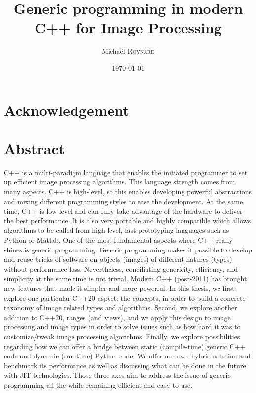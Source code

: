 \documentclass[11pt,a4paper]{book}
\author{Michaël \textsc{Roynard}}
\title{Generic programming in modern C++ for Image Processing}
\date{\today}
\begin{document}
\flyleaf
\cleardoublepage

\section*{Acknowledgement}
\label{sec:acknowledgement}


\section*{Abstract}
\label{sec:abstract}
C++ is a multi-paradigm language that enables the initiated programmer to set up efficient image processing algorithms.
This language strength comes from many aspects. C++ is high-level, so this enables developing powerful abstractions and
mixing different programming styles to ease the development. At the same time, C++ is low-level and can fully take
advantage of the hardware to deliver the best performance. It is also very portable and highly compatible which allows
algorithms to be called from high-level, fast-prototyping languages such as Python or Matlab. One of the most
fundamental aspects where C++ really shines is generic programming. Generic programming makes it possible to develop and
reuse bricks of software on objects (images) of different natures (types) without performance loss. Nevertheless,
conciliating genericity, efficiency, and simplicity at the same time is not trivial. Modern C++ (post-2011) has brought
new features that made it simpler and more powerful. In this thesis, we first explore one particular C++20 aspect: the
concepts, in order to build a concrete taxonomy of image related types and algorithms. Second, we explore another
addition to C++20, ranges (and views), and we apply this design to image processing and image types in order to solve
issues such as how hard it was to customize/tweak image processing algorithms. Finally, we explore possibilities
regarding how we can offer a bridge between static (compile-time) generic C++ code and dynamic (run-time) Python code.
We offer our own hybrid solution and benchmark its performance as well as discussing what can be done in the future with
JIT technologies. Those three axes aim to address the issue of generic programming all the while remaining efficient and
easy to use.

\bigskip

\bigskip
\end{document}
